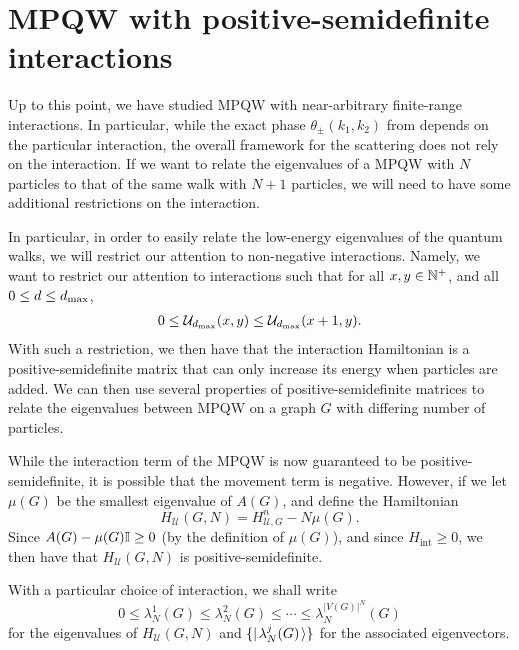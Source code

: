 \documentclass[../thesis-main/thesis-main]{subfiles}
\begin{document}
\section{MPQW with positive-semidefinite interactions}

Up to this point, we have studied MPQW with near-arbitrary finite-range interactions.  In particular, while the exact phase $\theta_\pm(k_1,k_2)$ from  depends on the particular interaction, the overall framework for the scattering does not rely on the interaction.  If we want to relate the eigenvalues of a MPQW with $N$ particles to that of the same walk with $N+1$ particles, we will need to have some additional restrictions on the interaction.

In particular, in order to easily relate the low-energy eigenvalues of the quantum walks, we will restrict our attention to non-negative interactions.  Namely, we want to restrict our attention to interactions such that for all $x,y \in \mathbb{N}^+$, and all $0\leq d \leq d_{\text{max}}$, 
\begin{align}
0 \leq \mathcal{U}_{d_{\text{max}}}(x,y) \leq \mathcal{U}_{d_{\text{max}}}(x+1,y).
\end{align}
With such a restriction, we then have that the interaction Hamiltonian is a positive-semidefinite matrix that can only increase its energy when particles are added.  We can then use several properties of positive-semidefinite matrices to relate the eigenvalues between MPQW on a graph $G$ with differing number of particles.

While the interaction term of the MPQW is now guaranteed to be positive-semidefinite, it is possible that the movement term is negative.  However, if we let $\mu(G)$ be the smallest eigenvalue of $A(G)$, and define the Hamiltonian
\begin{equation}
  H_{\mathcal{U}}(G,N) = H_{\mathcal{U},G}^n - N \mu(G).
\end{equation}
Since $A(G) - \mu(G) \mathbb{I}\geq 0$ (by the definition of $\mu(G)$), and since $H_{\text{int}} \geq 0$, we then have that $H_{\mathcal{U}}(G,N)$ is positive-semidefinite.

With a particular choice of interaction, we shall write
\begin{equation}
  0 \leq \lambda_N^1(G) \leq \lambda_N^2(G) \leq \cdots \leq \lambda_N^{|V(G)|^N} (G)
\end{equation}
for the eigenvalues of $H_{\mathcal{U}}(G,N)$ and $\{|\mspace{2mu} \lambda_N^j(G) \mspace{2mu} \rangle\}$ for the associated eigenvectors.
\end{document}
